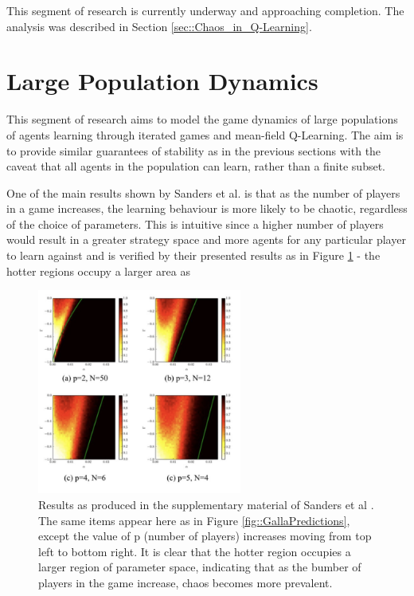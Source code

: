 \documentclass[.../main.tex]{subfiles}
\begin{document}
    This segment of research is currently underway and approaching completion. The analysis was
    described in Section \ref{sec::Chaos_in_Q-Learning}.


    \section{Large Population Dynamics} \label{sec::Large_Agent_Dynamics}

    This segment of research aims to model the game dynamics of large
    populations of agents learning through iterated games and
    mean-field Q-Learning. The aim is to provide similar guarantees of
    stability as in the previous sections with the caveat that all
    agents in the population can learn, rather than a finite subset.

    One of the main results shown by Sanders et al. \cite{Sanders2018}
    is that as the number of players in a game increases, the learning
    behaviour is more likely to be chaotic, regardless of the choice
    of parameters. This is intuitive since a higher number of players
    would result in a greater strategy space and more agents for any
    particular player to learn against and is verified by their
    presented results as in Figure \ref{fig::GallaPrevalence} - the
    hotter regions occupy a larger area as 

    \begin{figure}[h]
    	\centering
    	\includegraphics[width=0.6\textwidth]{Figures/GallaPrevalence}
    	\caption{ \label{fig::GallaPrevalence} Results as produced in
          the supplementary material of Sanders et al
          \cite{Sanders2018}. The same items appear here as in Figure
          \ref{fig::GallaPredictions}, except the value of p (number
          of players) increases moving from top left to bottom
          right. It is clear that the hotter region occupies a larger
          region of parameter space, indicating that as the bumber of
          players in the game increase, chaos becomes more prevalent.}
    \end{figure}
\end{document}

